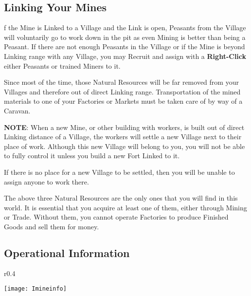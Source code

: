 \subsection{Linking Your Mines}


f the Mine is Linked to a Village and the Link is open, Peasants from the Village will voluntarily go to work down in the pit as even Mining is better than being a Peasant. If there are not enough Peasants in the Village or if the Mine is beyond Linking range with any Village, you may Recruit and assign with a \textbf{Right-Click} either Peasants or trained Miners to it.

Since most of the time, those Natural Resources will be far removed from your Villages and therefore out of direct Linking range. Transportation of the mined materials to one of your Factories or Markets must be taken care of by way of a Caravan.

\textbf{NOTE}: When a new Mine, or other building with workers, is built out of direct Linking distance of a Village, the workers will settle a new Village next to their place of work. Although this new Village will belong to you, you will not be able to fully control it unless you build a new Fort Linked to it.

If there is no place for a new Village to be settled, then you will be unable to assign anyone to work there.


The above three Natural Resources are the only ones that you will find in this world. It is essential that you acquire at least one of them, either through Mining or Trade. Without them, you cannot operate Factories to produce Finished Goods and sell them for money.

\subsection{Operational Information}


\begin{wrapfigure}{r}{0.4\textwidth}
	\vspace{-20pt}
	\begin{center}
		\texttt{[image: Imineinfo]} %
	\end{center}
	\vspace{-50pt}
\end{wrapfigure}

